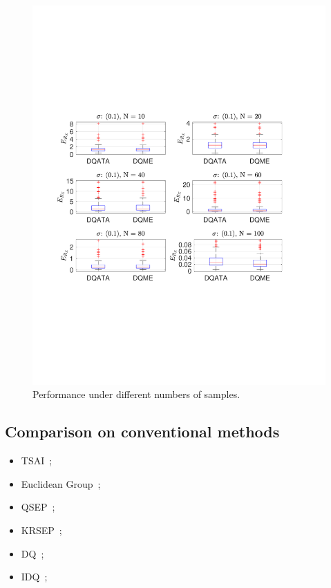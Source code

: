 \documentclass[a4paper]{report}
\begin{document}
\begin{figure}
\includegraphics[scale=0.6]{./hand_eye_figures/dq/dq_et_cmp_num}
\caption{Performance under different numbers of samples.}
\end{figure}


\subsection{Comparison on conventional methods}
\begin{itemize}
	\item TSAI~\cite{tsai1989new};
	\item Euclidean Group~\cite{park1994robot};
	\item QSEP~\cite{horaud1995hand};
	\item KRSEP~\cite{andreff1999line};
	\item DQ~\cite{daniilidis1999hand};
	\item IDQ~\cite{malti2010robust};
\end{itemize}
\end{document}
